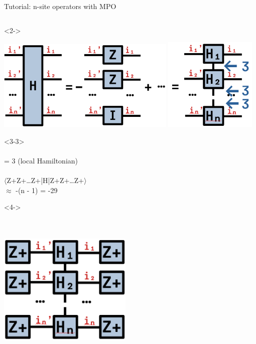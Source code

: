 \begin{frame}[fragile]{Tutorial: n-site operators with MPO}
\begin{columns}
\begin{column}{5.5cm}
\begin{onlyenv}<2->
\vspace*{0.0cm}
\begin{center}
\includegraphics[width=0.64\textwidth]{
  slides/assets/isingn.png
}
\includegraphics[width=0.33\textwidth]{
  slides/assets/isingn_mpo.png
}
\end{center}
\vspace*{0.0cm}
\end{onlyenv}

\begin{onlyenv}<3-3>
~\\
~\\
= 3 (local Hamiltonian) \\
~\\
$\langle$Z+Z+…Z+|H|Z+Z+…Z+$\rangle$ \\
  $\approx$ -(n - 1) = -29
\end{onlyenv}

\begin{onlyenv}<4->
\vspace*{0.0cm}
~\\
~\\
~\\
\begin{center}
\includegraphics[width=0.48\textwidth]{
  slides/assets/Zpn_H_Zpn.png
}
\end{center}
\vspace*{0.0cm}
\end{onlyenv}
\end{column}

\end{columns}

\end{frame}
